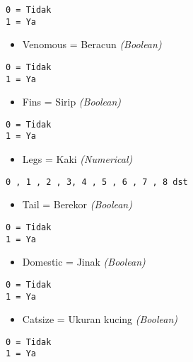 \documentclass[
  letterpaper,
]{krantz}
\providecommand{\tightlist}{%
  \setlength{\itemsep}{0pt}\setlength{\parskip}{0pt}}\usepackage{longtable,booktabs,array}
\begin{document}
\begin{verbatim}
0 = Tidak
1 = Ya
\end{verbatim}

\begin{itemize}
\tightlist
\item
  Venomous = Beracun \emph{(Boolean)}
\end{itemize}

\begin{verbatim}
0 = Tidak
1 = Ya
\end{verbatim}

\begin{itemize}
\tightlist
\item
  Fins = Sirip \emph{(Boolean)}
\end{itemize}

\begin{verbatim}
0 = Tidak
1 = Ya
\end{verbatim}

\begin{itemize}
\tightlist
\item
  Legs = Kaki \emph{(Numerical)}
\end{itemize}

\begin{verbatim}
0 , 1 , 2 , 3, 4 , 5 , 6 , 7 , 8 dst
\end{verbatim}

\begin{itemize}
\tightlist
\item
  Tail = Berekor \emph{(Boolean)}
\end{itemize}

\begin{verbatim}
0 = Tidak
1 = Ya
\end{verbatim}

\begin{itemize}
\tightlist
\item
  Domestic = Jinak \emph{(Boolean)}
\end{itemize}

\begin{verbatim}
0 = Tidak
1 = Ya
\end{verbatim}

\begin{itemize}
\tightlist
\item
  Catsize = Ukuran kucing \emph{(Boolean)}
\end{itemize}

\begin{verbatim}
0 = Tidak
1 = Ya
\end{verbatim}
\end{document}

